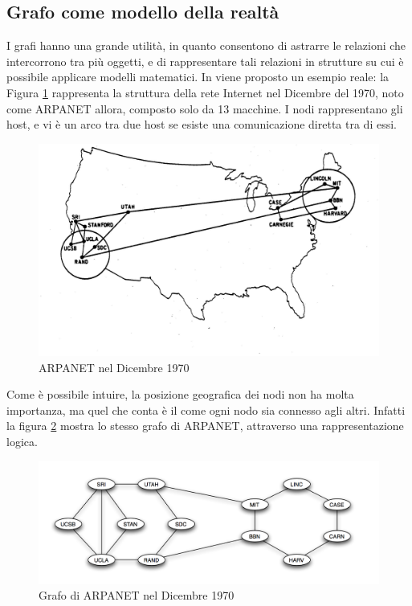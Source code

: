 \subsection{Grafo come modello della realtà}
I grafi hanno una grande utilità, in quanto consentono di astrarre le relazioni che intercorrono tra più oggetti, e di rappresentare tali relazioni in strutture su cui è possibile applicare modelli matematici. In \cite{easley2010networks} viene proposto un esempio reale: la Figura \ref{arpanet} rappresenta la struttura della rete Internet nel Dicembre del 1970, noto come ARPANET allora, composto solo da 13 macchine. I nodi rappresentano gli host, e vi è un arco tra due host se esiste una comunicazione diretta tra di essi.
\begin{figure}[h!]
	\centering
	\includegraphics[scale=.7]{img/arpanetdec1970.jpg}
	\caption{ARPANET nel Dicembre 1970}
	\label{arpanet}
\end{figure}
Come è possibile intuire, la posizione geografica dei nodi non ha molta importanza, ma quel che conta è il come ogni nodo sia connesso agli altri. Infatti la figura \ref{arpanet_graph} mostra lo stesso grafo di ARPANET, attraverso una rappresentazione logica.
\begin{figure}
	\centering
	\includegraphics[scale=.5]{img/arpanetdec1970_graph.png}
	\caption{Grafo di ARPANET nel Dicembre 1970}
	\label{arpanet_graph}
\end{figure}
